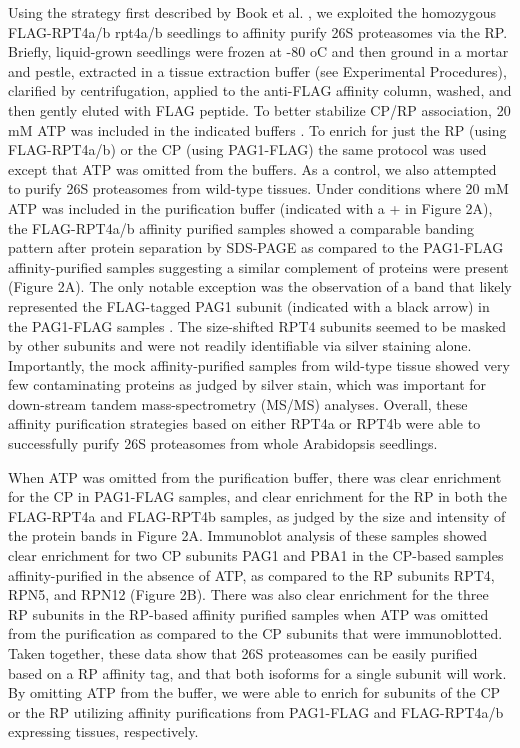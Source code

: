 	Using the strategy first described by Book et al. \citep{book10}, we exploited the homozygous FLAG-RPT4a/b rpt4a/b seedlings to affinity purify 26S proteasomes via the RP. Briefly, liquid-grown seedlings were frozen at -80 oC and then ground in a mortar and pestle, extracted in a tissue extraction buffer (see Experimental Procedures), clarified by centrifugation, applied to the anti-FLAG affinity column, washed, and then gently eluted with FLAG peptide.  To better stabilize CP/RP association, 20 mM ATP was included in the indicated buffers \citep{book10, liu06}. To enrich for just the RP (using FLAG-RPT4a/b) or the CP (using PAG1-FLAG) the same protocol was used except that ATP was omitted from the buffers. As a control, we also attempted to purify 26S proteasomes from wild-type tissues.  Under conditions where 20 mM ATP was included in the purification buffer (indicated with a + in Figure 2A), the FLAG-RPT4a/b affinity purified samples showed a comparable banding pattern after protein separation by SDS-PAGE as compared to the PAG1-FLAG affinity-purified samples suggesting a similar complement of proteins were present (Figure 2A). The only notable exception was the observation of a band that likely represented the FLAG-tagged PAG1 subunit (indicated with a black arrow) in the PAG1-FLAG samples \citep{book10}. The size-shifted RPT4 subunits seemed to be masked by other subunits and were not readily identifiable via silver staining alone. Importantly, the mock affinity-purified samples from wild-type tissue showed very few contaminating proteins as judged by silver stain, which was important for down-stream tandem mass-spectrometry (MS/MS) analyses. Overall, these affinity purification strategies based on either RPT4a or RPT4b were able to successfully purify 26S proteasomes from whole Arabidopsis seedlings.

	When ATP was omitted from the purification buffer, there was clear enrichment for the CP in PAG1-FLAG samples, and clear enrichment for the RP in both the FLAG-RPT4a and FLAG-RPT4b samples, as judged by the size and intensity of the protein bands in Figure 2A. Immunoblot analysis of these samples showed clear enrichment for two CP subunits PAG1 and PBA1 in the CP-based samples affinity-purified in the absence of ATP, as compared to the RP subunits RPT4, RPN5, and RPN12 (Figure 2B). There was also clear enrichment for the three RP subunits in the RP-based affinity purified samples when ATP was omitted from the purification as compared to the CP subunits that were immunoblotted.  Taken together, these data show that 26S proteasomes can be easily purified based on a RP affinity tag, and that both isoforms for a single subunit will work. By omitting ATP from the buffer, we were able to enrich for subunits of the CP or the RP utilizing affinity purifications from PAG1-FLAG and FLAG-RPT4a/b expressing tissues, respectively. 

